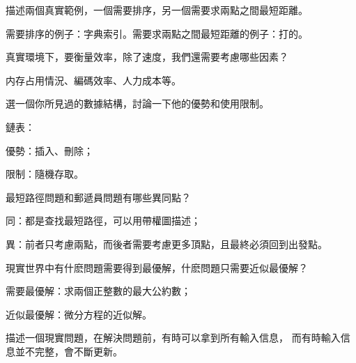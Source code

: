 \startsection[
  title={Algorithms},
]

\startEXERCISE
描述兩個真實範例，一個需要排序，另一個需要求兩點之間最短距離。
\stopEXERCISE

\startANSWER
需要排序的例子：字典索引。需要求兩點之間最短距離的例子：打的。
\stopANSWER

\startEXERCISE
真實環境下，要衡量效率，除了速度，我們還需要考慮哪些因素？
\stopEXERCISE

\startANSWER
内存占用情況、編碼效率、人力成本等。
\stopANSWER

\startEXERCISE
選一個你所見過的數據結構，討論一下他的優勢和使用限制。
\stopEXERCISE

\startANSWER
鏈表：
\startigBase
\item 優勢：插入、刪除；
\item 限制：隨機存取。
\stopigBase
\stopANSWER

\startEXERCISE
最短路徑問題和郵遞員問題有哪些異同點？
\stopEXERCISE

\startANSWER
\startigBase
\item 同：都是查找最短路徑，可以用帶權圖描述；
\item 異：前者只考慮兩點，而後者需要考慮更多頂點，且最終必須回到出發點。
\stopigBase
\stopANSWER

\startEXERCISE
現實世界中有什麽問題需要得到最優解，什麽問題只需要近似最優解？
\stopEXERCISE

\startANSWER
\startigBase
\item 需要最優解：求兩個正整數的最大公約數；
\item 近似最優解：微分方程的近似解。
\stopigBase
\stopANSWER

\startEXERCISE
描述一個現實問題，在解決問題前，有時可以拿到所有輸入信息，
而有時輸入信息並不完整，會不斷更新。
\stopEXERCISE

\startANSWER
{}
\stopANSWER

\stopsection
